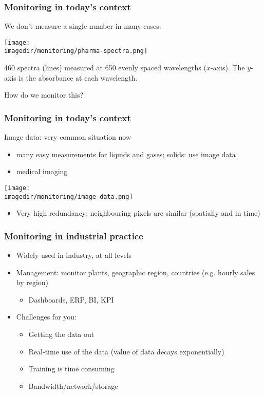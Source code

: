 \begin{frame}\frametitle{Monitoring in today's context}
	
	We don't measure a single number in many cases:
	
	\texttt{[image: \\imagedir/monitoring/pharma-spectra.png]}
	
	460 spectra (lines) measured at 650 evenly spaced wavelengths ($x$-axis). The $y$-axis is the absorbance at each wavelength.
	
	How do we monitor this?
\end{frame}

\begin{frame}\frametitle{Monitoring in today's context}
	
	Image data: very common situation now 
	\begin{itemize}
		\item	many easy measurements for liquids and gases; solids: use image data 
		\item	medical imaging 
	\end{itemize}
	
	\texttt{[image: \\imagedir/monitoring/image-data.png]}
	\begin{itemize}
		\item	Very high redundancy: neighbouring pixels are similar (spatially and in time) 
	\end{itemize}
\end{frame}

\begin{frame}\frametitle{Monitoring in industrial practice}
	\begin{itemize}
		\item	Widely used in industry, at all levels 
		\item	Management: monitor plants, geographic region, countries (e.g. hourly sales by region) 
		\begin{itemize}
			\item	Dashboards, ERP, BI, KPI 
		\end{itemize}
	\end{itemize}
	\begin{itemize}
		\item	Challenges for you: 
		\begin{itemize}
			\item	Getting the data out 
			\item	Real-time use of the data (value of data decays exponentially) 
			\item	Training is time consuming 
			\item	Bandwidth/network/storage 
		\end{itemize}
	\end{itemize}
\end{frame}

